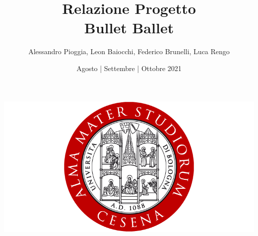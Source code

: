 \documentclass[a4paper,12pt]{report}
\title{Relazione Progetto \\ \textbf{Bullet Ballet}}
\author{Alessandro Pioggia, Leon Baiocchi, Federico Brunelli, Luca Rengo}
\date{Agosto | Settembre | Ottobre 2021}
\begin{document}
\makeatletter
\begin{titlepage}
	\begin{center}
		\includegraphics[width=0.7\linewidth]{img/alma_mater_studiorum_cesena_logo.png}\\[4ex]
		{\Huge  \@title }\\[3ex] 
		{\large  \@author}\\[3ex] 
		{\large \@date}
	\end{center}
\end{titlepage}
\makeatother
\thispagestyle{empty}
\newpage


\tableofcontents














\end{document}
